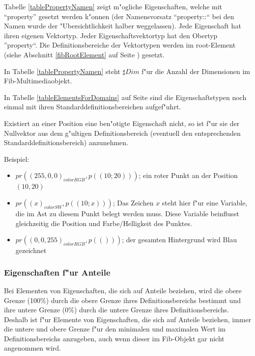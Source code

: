 Tabelle \ref{tablePropertyNamen} zeigt m"ogliche Eigenschaften, welche mit ``property'' gesetzt werden k"onnen (der Namensvorsatz ``property::`` bei den Namen wurde der "Ubersichtlichkeit halber weggelassen). Jede Eigenschaft hat ihren eigenen Vektortyp. Jeder Eigenschaftsvektortyp hat den Obertyp ''property``. Die Definitionsbereiche der Vektortypen werden im root-Element (siehe Abschnitt \ref{fibRootElement} auf Seite \pageref{fibRootElement}) gesetzt.

In Tabelle \ref{tablePropertyNamen} steht $\sharp Dim$ f"ur die Anzahl der Dimensionen im Fib-Multi\-media\-objekt.

In Tabelle \ref{tableElementsForDomains} auf Seite \pageref{tableElementsForDomains} sind die Eigenschaftstypen noch einmal mit ihren Standarddefinitionsbereichen aufgef"uhrt.

Existiert an einer Position eine ben"otigte Eigenschaft nicht, so ist f"ur sie der Nullvektor aus dem g"ultigen Definitionsbereich (eventuell den entsprechenden Standarddefinitionsbereich) anzunehmen.

\bigskip\noindent
Beispiel:
\begin{itemize}
 \item $pr( (255, 0, 0)_{colorRGB}, p((10;20)) )$; ein roter Punkt an der Position $(10, 20)$
 \item $pr( (x)_{colorSW}, p((10;x)) )$; Das Zeichen $x$ steht hier f"ur eine Variable, die im Ast zu diesem Punkt belegt werden muss. Diese Variable beinflusst gleichzeitig die Position und Farbe/Helligkeit des Punktes.
 \item $pr( ( 0, 0, 255)_{colorRGB}, p(()) )$; der gesamten Hintergrund wird Blau gezeichnet
\end{itemize}


\subsubsection{Eigenschaften f"ur Anteile}

Bei Elementen von Eigenschaften, die sich auf Anteile beziehen, wird die obere Grenze (100\%) durch die obere Grenze ihres Definitionsbereichs bestimmt und ihre untere Grenze (0\%) durch die untere Grenze ihres Definitionsbereichs. Deshalb ist f"ur Elemente von Eigenschaften, die sich auf Anteile beziehen, immer die untere und obere Grenze f"ur den minimalen und maximalen Wert im Definitionsbereichs anzugeben, auch wenn dieser im Fib-Objekt gar nicht angenommen wird.

